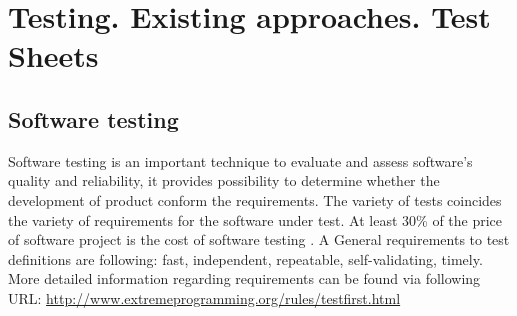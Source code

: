 \chapter{Testing. Existing approaches. Test Sheets}
\section{Software testing}
Software testing is an important technique to evaluate and assess software's quality and reliability, it provides possibility to determine whether the development of product conform the requirements. The variety of tests coincides the variety of requirements for the software under test. At least 30\% of the price of software project is the cost of software testing \cite{Lecture2}. 
A General requirements to test definitions are following: fast, independent, repeatable, self-validating, timely.
More detailed information regarding requirements can be found via following URL: \url{http://www.extremeprogramming.org/rules/testfirst.html}
